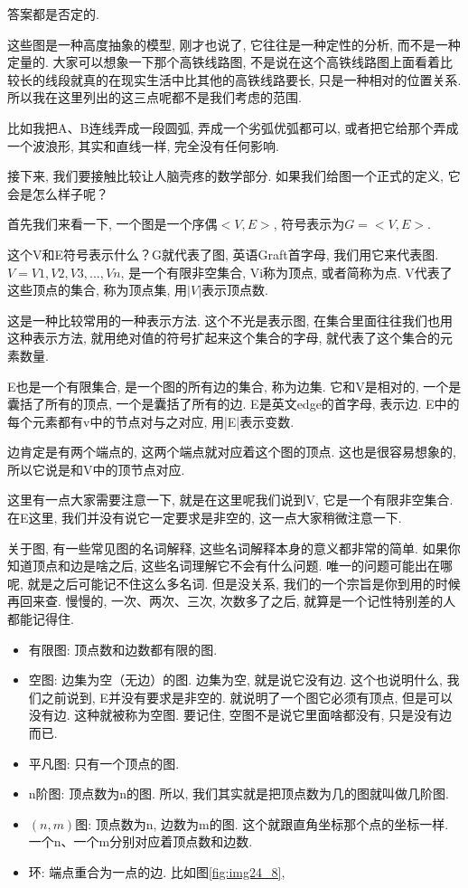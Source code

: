 答案都是否定的. 

这些图是一种高度抽象的模型, 刚才也说了, 它往往是一种定性的分析, 而不是一种定量的. 大家可以想象一下那个高铁线路图, 不是说在这个高铁线路图上面看着比较长的线段就真的在现实生活中比其他的高铁线路要长, 只是一种相对的位置关系. 所以我在这里列出的这三点呢都不是我们考虑的范围. 

比如我把A、B连线弄成一段圆弧, 弄成一个劣弧优弧都可以, 或者把它给那个弄成一个波浪形, 其实和直线一样, 完全没有任何影响. 

接下来, 我们要接触比较让人脑壳疼的数学部分. 如果我们给图一个正式的定义, 它会是怎么样子呢？

首先我们来看一下, 一个图是一个序偶$<V,E>$, 符号表示为$G = <V, E>$. 

这个V和E符号表示什么？G就代表了图, 英语Graft首字母, 我们用它来代表图. \(V = {V1, V2, V3, ..., Vn}\), 是一个有限非空集合, Vi称为顶点, 或者简称为点. V代表了这些顶点的集合, 称为顶点集,  用\(|V|\)表示顶点数. 

这是一种比较常用的一种表示方法. 这个不光是表示图, 在集合里面往往我们也用这种表示方法, 就用绝对值的符号扩起来这个集合的字母, 就代表了这个集合的元素数量. 

E也是一个有限集合, 是一个图的所有边的集合, 称为边集. 它和V是相对的, 一个是囊括了所有的顶点, 一个是囊括了所有的边. E是英文edge的首字母, 表示边. E中的每个元素都有v中的节点对与之对应, 用|E|表示变数. 

边肯定是有两个端点的, 这两个端点就对应着这个图的顶点. 这也是很容易想象的, 所以它说是和V中的顶节点对应. 

这里有一点大家需要注意一下, 就是在这里呢我们说到V, 它是一个有限非空集合. 在E这里, 我们并没有说它一定要求是非空的, 这一点大家稍微注意一下. 

关于图, 有一些常见图的名词解释, 这些名词解释本身的意义都非常的简单. 如果你知道顶点和边是啥之后, 这些名词理解它不会有什么问题. 唯一的问题可能出在哪呢, 就是之后可能记不住这么多名词. 但是没关系, 我们的一个宗旨是你到用的时候再回来查. 慢慢的, 一次、两次、三次, 次数多了之后, 就算是一个记性特别差的人都能记得住. 

\begin{itemize}
  \item 有限图: 顶点数和边数都有限的图. 
  \item 空图: 边集为空（无边）的图. 边集为空, 就是说它没有边. 这个也说明什么, 我们之前说到, E并没有要求是非空的. 就说明了一个图它必须有顶点, 但是可以没有边. 这种就被称为空图. 要记住, 空图不是说它里面啥都没有, 只是没有边而已. 
  \item 平凡图: 只有一个顶点的图. 
  \item n阶图: 顶点数为n的图. 所以, 我们其实就是把顶点数为几的图就叫做几阶图. 
  \item $(n,m)$图: 顶点数为n, 边数为m的图. 这个就跟直角坐标那个点的坐标一样. 一个n、一个m分别对应着顶点数和边数. 
  \item 环: 端点重合为一点的边. 比如图\ref{fig:img24_8}, 
\end{itemize}

